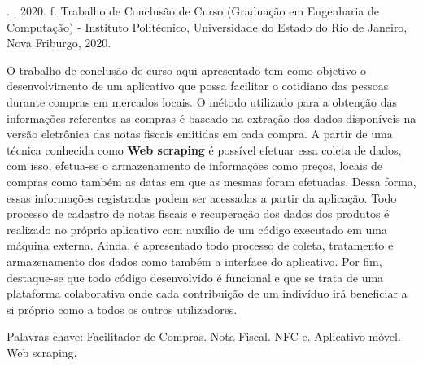 \begin{resumo}

\noindent
\entradaAutor{}. \textit{\imprimirtitulo}. 2020. \pageref{LastPage} f. Trabalho de Conclusão de Curso (Graduação em Engenharia de Computação) - Instituto Politécnico, Universidade do Estado do Rio de Janeiro, Nova Friburgo, 2020.
\vspace{\onelineskip}

\setlength{\parindent}{1.3cm}
O trabalho de conclusão de curso aqui apresentado tem como objetivo o desenvolvimento de um aplicativo que possa facilitar o cotidiano das pessoas durante compras em mercados locais. O método utilizado para a obtenção das informações referentes as compras é baseado na extração dos dados disponíveis na versão eletrônica das notas fiscais emitidas em cada compra. A partir de uma técnica conhecida como \textbf{Web scraping} é possível efetuar essa coleta de dados, com isso, efetua-se o armazenamento de informações como preços, locais de compras como também as datas em que as mesmas foram efetuadas. Dessa forma, essas informações registradas podem ser acessadas a partir da aplicação. Todo processo de cadastro de notas fiscais e recuperação dos dados dos produtos é realizado no próprio aplicativo com auxílio de um código executado em uma máquina externa. Ainda, é apresentado todo processo de coleta, tratamento e armazenamento dos dados como também a interface do aplicativo. Por fim, destaque-se que todo código desenvolvido é funcional e que se trata de uma plataforma colaborativa onde cada contribuição de um indivíduo irá beneficiar a si próprio como a todos os outros utilizadores.

\vspace{\onelineskip}
\noindent Palavras-chave: Facilitador de Compras. Nota Fiscal. NFC-e. Aplicativo móvel. Web scraping.

\end{resumo}